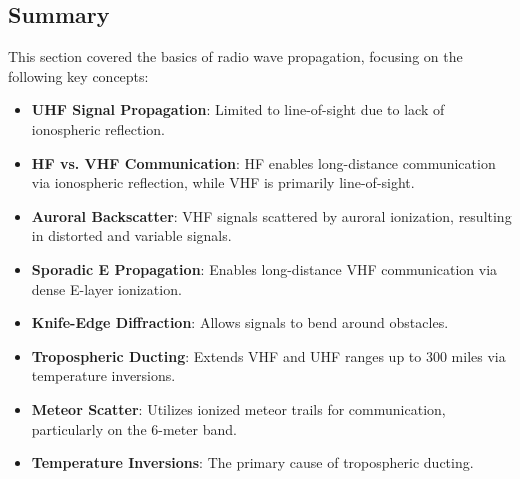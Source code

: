 
\subsection*{Summary}
This section covered the basics of radio wave propagation, focusing on the following key concepts:
\begin{itemize}
    \item \textbf{UHF Signal Propagation}: Limited to line-of-sight due to lack of ionospheric reflection.
    \item \textbf{HF vs. VHF Communication}: HF enables long-distance communication via ionospheric reflection, while VHF is primarily line-of-sight.
    \item \textbf{Auroral Backscatter}: VHF signals scattered by auroral ionization, resulting in distorted and variable signals.
    \item \textbf{Sporadic E Propagation}: Enables long-distance VHF communication via dense E-layer ionization.
    \item \textbf{Knife-Edge Diffraction}: Allows signals to bend around obstacles.
    \item \textbf{Tropospheric Ducting}: Extends VHF and UHF ranges up to 300 miles via temperature inversions.
    \item \textbf{Meteor Scatter}: Utilizes ionized meteor trails for communication, particularly on the 6-meter band.
    \item \textbf{Temperature Inversions}: The primary cause of tropospheric ducting.
\end{itemize}
